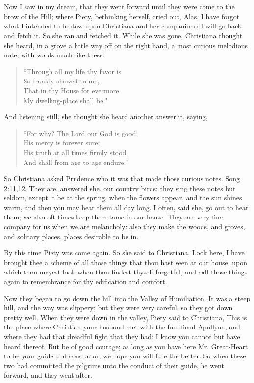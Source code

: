 \chapter[THE FIFTH STAGE]{}

Now I saw in my dream, that they went forward until they were come to the brow of the Hill; where Piety, bethinking herself, cried out, Alas, I have forgot what I intended to bestow upon Christiana and her companions: I will go back and fetch it. So she ran and fetched it. While she was gone, Christiana thought she heard, in a grove a little way off on the right hand, a most curious melodious note, with words much like these:
\begin{verse}
``Through all my life thy favor is\\
So frankly showed to me,\\
That in thy House for evermore\\
My dwelling-place shall be."\\
\end{verse}
And listening still, she thought she heard another answer it, saying,
\begin{verse}
``For why? The Lord our God is good;\\
His mercy is forever sure;\\
His truth at all times firmly stood,\\
And shall from age to age endure."\\
\end{verse}

So Christiana asked Prudence who it was that made those curious notes. Song 2:11,12. They are, answered she, our country birds: they sing these notes but seldom, except it be at the spring, when the flowers appear, and the sun shines warm, and then you may hear them all day long. I often, said she, go out to hear them; we also oft-times keep them tame in our house. They are very fine company for us when we are melancholy: also they make the woods, and groves, and solitary places, places desirable to be in.

By this time Piety was come again. So she said to Christiana, Look here, I have brought thee a scheme of all those things that thou hast seen at our house, upon which thou mayest look when thou findest thyself forgetful, and call those things again to remembrance for thy edification and comfort.

Now they began to go down the hill into the Valley of Humiliation. It was a steep hill, and the way was slippery; but they were very careful; so they got down pretty well. When they were down in the valley, Piety said to Christiana, This is the place where Christian your husband met with the foul fiend Apollyon, and where they had that dreadful fight that they had: I know you cannot but have heard thereof. But be of good courage; as long as you have here Mr. Great-Heart to be your guide and conductor, we hope you will fare the better. So when these two had committed the pilgrims unto the conduct of their guide, he went forward, and they went after.

